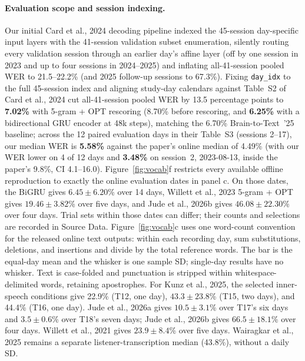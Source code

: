 \documentclass[11pt]{article}
\begin{document}
\paragraph{Evaluation scope and session indexing.} Our initial Card et al.,
2024 decoding pipeline indexed the 45-session day-specific input layers
with the 41-session validation subset enumeration, silently routing
every validation session through an earlier day's affine layer (off by
one session in 2023 and up to four sessions in 2024--2025) and inflating
all-41-session pooled WER to 21.5--22.2\% (and 2025 follow-up sessions
to 67.3\%). Fixing \texttt{day\_idx} to the full 45-session index and aligning
study-day calendars against Table~S2 of Card et al., 2024 cut all-41-session
pooled WER by 13.5 percentage points to \textbf{7.02\%} with 5-gram +
OPT rescoring (8.70\% before rescoring, and \textbf{6.25\%} with a
bidirectional GRU encoder at 48k steps), matching the 6.70\%
Brain-to-Text~'25 baseline; across the 12 paired evaluation days in
their Table~S3 (sessions 2--17), our median WER is \textbf{5.58\%} against the
paper's online median of 4.49\% (with our WER lower on 4 of 12 days and
\textbf{3.48\%} on session~2, 2023-08-13, inside the paper's 9.8\%, CI
4.1--16.0). Figure~\ref{fig:vocab}f restricts every available offline reproduction
to exactly the online evaluation dates in panel c. On those dates, the
BiGRU gives $6.45\pm6.20$\% over 14 days, Willett et al., 2023
5-gram + OPT gives $19.46\pm3.82$\% over five days, and Jude et al.,
2026b gives $46.08\pm22.30$\% over four days. Trial sets within those
dates can differ; their counts and selections are recorded in Source Data.
Figure~\ref{fig:vocab}c uses one word-count convention for the released
online text outputs: within each recording day, sum substitutions,
deletions, and insertions and divide by the total reference words.
The bar is the equal-day mean and the whisker is one sample SD;
single-day results have no whisker. Text is case-folded and punctuation
is stripped within whitespace-delimited words, retaining apostrophes.
For Kunz et al., 2025, the selected inner-speech conditions give 22.9\%
(T12, one day), $43.3\pm23.8$\% (T15, two days), and 44.4\%
(T16, one day). Jude et al., 2026a gives $10.5\pm3.1$\% over T17's
six days and $3.5\pm0.6$\% over T18's seven days; Jude et al., 2026b
gives $66.5\pm18.1$\% over four days. Willett et al., 2021 gives
$23.9\pm8.4$\% over five days. Wairagkar et al., 2025 remains a
separate listener-transcription median (43.8\%), without a daily SD.
\end{document}
